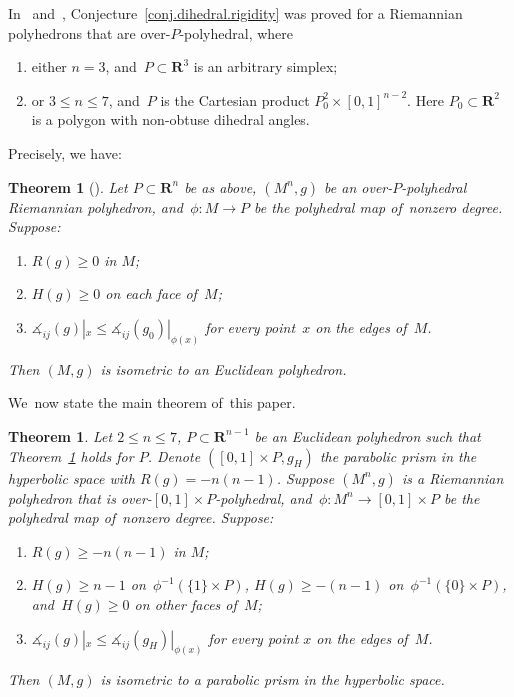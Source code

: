 \documentclass[pdftex]{sigma}
\numberwithin{equation}{section}
\newtheorem{theo}[prop]{Theorem}
\theoremstyle{definition}
\newcommand{\RR}{\mathbf{R}}
\begin{document}
In~\cite{Li2017polyhedron} and~\cite{li2019dihedral}, Conjecture~\ref{conj.dihedral.rigidity} was proved for a Riemannian polyhedrons that are over-$P$-polyhedral, where
\begin{enumerate}\itemsep=0pt
\item[1)] either $n=3$, and~$P\subset\RR^3$ is an arbitrary simplex;
\item[2)] or $3\le n\le 7$, and~$P$ is the Cartesian product $P_0^2\times [0,1]^{n-2}$. Here $P_0\subset \RR^2$ is a polygon with non-obtuse dihedral angles.
\end{enumerate}
Precisely, we have:

\begin{theo}[\cite{Li2017polyhedron,li2019dihedral}]\label{theo.dihedral.rigidity}
Let $P\subset \RR^n$ be as above, $(M^n,g)$ be an over-$P$-polyhedral Riemannian polyhedron, and~$\phi\colon M\rightarrow P$ be the polyhedral map of~nonzero degree. Suppose:
\begin{enumerate}\itemsep=0pt
\item[${\rm 1)}$] $R(g)\ge 0$ in $M$;
\item[${\rm 2)}$] $H(g)\ge 0$ on each face of~$M$;
\item[${\rm 3)}$] $\measuredangle_{ij}(g)|_x\le \measuredangle_{ij}(g_0)|_{\phi(x)}$ for every point~$x$ on the edges of~$M$.
\end{enumerate}
Then $(M,g)$ is isometric to an Euclidean polyhedron.
\end{theo}

We~now state the main theorem of~this paper.

\begin{theo}\label{theo.main}Let $2\le n \le 7$, $P\subset \RR^{n-1}$ be an Euclidean polyhedron such that Theorem~{\rm \ref{theo.dihedral.rigidity}} holds for $P$. Denote $([0,1]\times P,g_H)$ the parabolic prism in the hyperbolic space with $R(g)=-n(n-1)$. Suppose $(M^n,g)$ is a Riemannian polyhedron that is over-$[0,1]\times P$-polyhedral, and~$\phi\colon M^n\rightarrow [0,1]\times P$ be the polyhedral map of~nonzero degree. Suppose:
\begin{enumerate}\itemsep=0pt
\item[${\rm 1)}$] $R(g)\ge -n(n-1)$ in $M$;
\item[${\rm 2)}$] $H(g)\ge n-1$ on~$\phi^{-1}(\{1\}\times P)$, $H(g)\ge -(n-1)$ on~$\phi^{-1}(\{0\}\times P)$, and~$H(g)\ge 0$ on other faces of~$M$;
\item[${\rm 3)}$] $\measuredangle_{ij}(g)|_x\le \measuredangle_{ij}(g_H)|_{\phi(x)}$ for every point $x$ on the edges of~$M$.
\end{enumerate}
Then $(M,g)$ is isometric to a parabolic prism in the hyperbolic space.
\end{theo}
\end{document}
